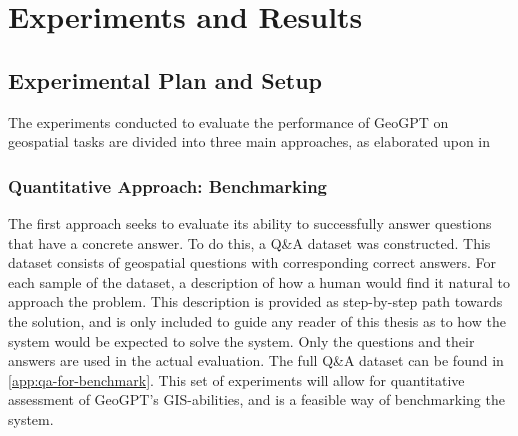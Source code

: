 \chapter{Experiments and Results}
\label{cha:experiments}

\section{Experimental Plan and Setup}
\label{sec:experimental-plan-and-setup}

\begin{comment}
Trying and failing is a major part of research. However, to have a chance of success you need a plan driving the experimental research, just as you need a plan for your literature search. Further, plans are made to be revised and this revision ensures that any further decisions made are in line with the work already completed.

The plan should include what experiments or series of experiments are planned and what questions the individual or set of experiments aim to answer. Such questions should be connected to your research questions, so that in the evaluation of your results you can discuss the results wrt to the research questions.
\end{comment}

\begin{comment}
The experimental setup should include all data --- parameters, etc. --- that would allow a person to repeat your experiments.
This will thus be the actual instantiation for each experiment of the general architecture described in Chapter~\ref{cha:architecture}.
\end{comment}

The experiments conducted to evaluate the performance of GeoGPT on geospatial tasks are divided into three main approaches, as elaborated upon in

\subsection{Quantitative Approach: Benchmarking}

The first approach seeks to evaluate its ability to successfully answer questions that have a concrete answer. To do this, a Q\&A dataset was constructed. This dataset consists of geospatial questions with corresponding correct answers. For each sample of the dataset, a description of how a human would find it natural to approach the problem. This description is provided  as step-by-step path towards the solution, and is only included to guide any reader of this thesis as to how the system would be expected to solve the system. Only the questions and their answers are used in the actual evaluation. The full Q\&A dataset can be found in \autoref{app:qa-for-benchmark}. This set of experiments will allow for quantitative assessment of GeoGPT's GIS-abilities, and is a feasible way of benchmarking the system.

